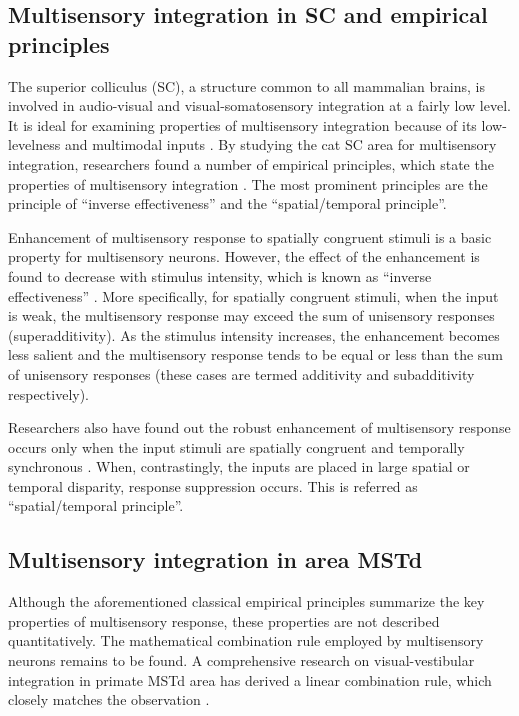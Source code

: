 \documentclass{article}[11pt]
\begin{document}

\subsection{Multisensory integration in SC and empirical principles}
The superior colliculus (SC), a structure common to all mammalian brains, is involved in audio-visual and visual-somatosensory integration at a fairly low level. It is ideal for examining properties of multisensory integration because of its low-levelness and multimodal inputs \cite{alais_multisensory_2010}.
By studying the cat SC area for multisensory integration, researchers found a number of empirical principles, which state the properties of multisensory integration \cite{stein_merging_1993}. The most prominent principles are the principle of ``inverse effectiveness'' and the ``spatial/temporal principle''.

Enhancement of multisensory response to spatially congruent stimuli is a basic property for multisensory neurons. However, the effect of the enhancement is found to decrease with stimulus intensity, which is known as ``inverse effectiveness'' \cite{meredith_visual_1986}. More specifically, for spatially congruent stimuli, when the input is weak, the multisensory response may exceed the sum of unisensory responses (superadditivity). As the stimulus intensity increases, the enhancement becomes less salient and the multisensory response tends to be equal or less than the sum of unisensory responses (these cases are termed additivity and subadditivity respectively).

Researchers also have found out the robust enhancement of multisensory response occurs only when the input stimuli are spatially congruent and temporally synchronous \cite{meredith_determinants_1987, meredith_spatial_1996}. When, contrastingly, the inputs are placed in large spatial or temporal disparity, response suppression occurs. This is referred as ``spatial/temporal principle''.

\subsection{Multisensory integration in area MSTd}
Although the aforementioned classical empirical principles summarize the key properties of multisensory response, these properties are not described quantitatively. The mathematical combination rule employed by multisensory neurons remains to be found. A comprehensive research on visual-vestibular integration in primate MSTd area has derived a linear combination rule, which closely matches the observation \cite{morgan_multisensory_2008}.
\end{document}
